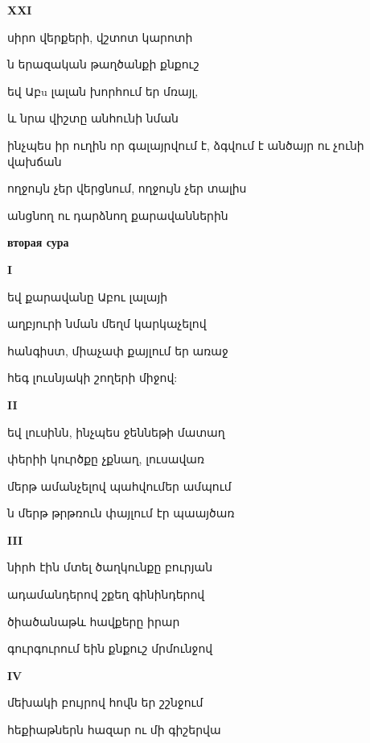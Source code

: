 \centerline {\bf XXI}
սիրո վերքերի, վշտոտ  կարոտի 



ն երազական թաղծանքի քնքուշ


եվ Աբu  լալան խորհում եր մռայլ, 



և նրա վիշտը անհունի նման


ինչպես իր ուղին որ գալայրվում է, ձգվում է անծայր ու չունի վախճան



ողջույն չեր վերցնում, ողջույն չեր տալիս 


անցնող ու դարձնող  քարավաններին


{\bf   вторая  сура}


\centerline  {\bf I}

եվ քարավանը Աբու լալայի 




աղբյուրի նման մեղմ կարկաչելով



հանգիստ, միաչափ   քայլում եր առաջ



հեգ լուսնյակի  շողերի միջով:



 \centerline {\bf II} 



եվ լուսինն, ինչպես ջեննեթի մատաղ  



փերիի կուրծքը  չքնաղ, լուսավառ



մերթ ամանչելով  պահվումեր ամպում



ն մերթ թրթռուն փայլում  էր պաայծառ


\centerline{ \bf III}

նիրհ էին մտել ծաղկունքը բուրյան 



ադամանդերով շքեղ գինինդերով



ծիածանաթև  հավքերը   իրար



գուրգուրում    եին քնքուշ  մրմունջով



\centerline {\bf  IV}



մեխակի բույրով հովն եր շշնջում




հեքիաթներն հազար  ու մի գիշերվա 





